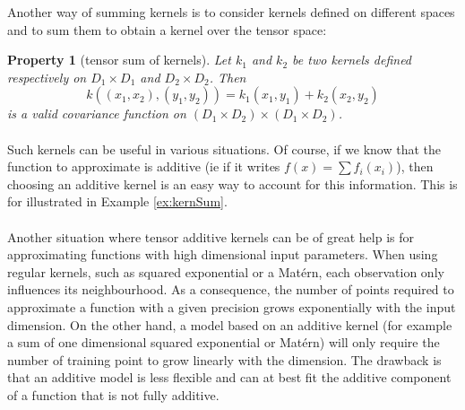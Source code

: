 \documentclass[twoside,openright]{report}
\newtheorem{property}{Property}
\begin{document}
Another way of summing kernels is to consider kernels defined on different spaces and to sum them to obtain a kernel over the tensor space:
\begin{property}[tensor sum of kernels]
	Let $k_1$ and $k_2$ be two kernels defined respectively on $D_1 \times D_1$ and $D_2 \times D_2$. Then 
	\begin{equation}
		k((x_1,x_2),(y_1,y_2)) = k_1(x_1,y_1) + k_2(x_2,y_2)
	\end{equation}
	is a valid covariance function on $(D_1 \times D_2) \times (D_1 \times D_2)$.
\end{property}

\paragraph{}
Such kernels can be useful in various situations. Of course, if we know that the function to approximate is additive (ie if it writes $f(x)= \sum f_i(x_i)$), then choosing an additive kernel is an easy way to account for this information. This is for illustrated in Example \ref{ex:kernSum}. 

\paragraph{}
Another situation where tensor additive kernels can be of great help is for approximating functions with high dimensional input parameters. When using regular kernels, such as squared exponential or a Mat\'ern, each observation only influences its neighbourhood. As a consequence, the number of points required to approximate a function with a given precision grows exponentially with the input dimension. On the other hand, a model based on an additive kernel (for example a sum of one dimensional squared exponential or Mat\'ern) will only require the number of training point to grow linearly with the dimension. The drawback is that an additive model is less flexible and can at best fit the additive component of a function that is not fully additive.
\end{document}
